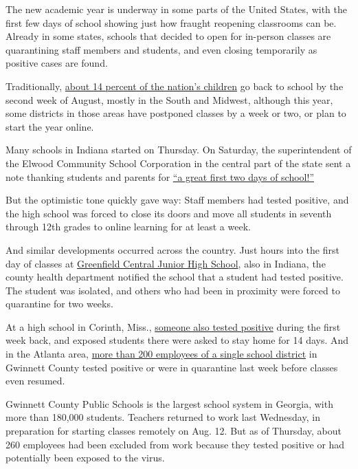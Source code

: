 The new academic year is underway in some parts of the United States,
with the first few days of school showing just how fraught reopening
classrooms can be. Already in some states, schools that decided to open
for in-person classes are quarantining staff members and students, and
even closing temporarily as positive cases are found.

Traditionally,
\href{https://www.pewresearch.org/fact-tank/2019/08/14/back-to-school-dates-u-s/}{about
14 percent of the nation's children} go back to school by the second
week of August, mostly in the South and Midwest, although this year,
some districts in those areas have postponed classes by a week or two,
or plan to start the year online.

Many schools in Indiana started on Thursday. On Saturday, the
superintendent of the Elwood Community School Corporation in the central
part of the state sent a note thanking students and parents for
\href{https://www.facebook.com/ElwoodCommunitySchools/photos/pcb.1875944365880857/1875944205880873/?type=3\&theater}{``a
great first two days of school!''}

But the optimistic tone quickly gave way: Staff members had tested
positive, and the high school was forced to close its doors and move all
students in seventh through 12th grades to online learning for at least
a week.

And similar developments occurred across the country. Just hours into
the first day of classes at
\href{https://www.nytimes.com/2020/08/01/us/schools-reopening-indiana-coronavirus.html}{Greenfield
Central Junior High School}, also in Indiana, the county health
department notified the school that a student had tested positive. The
student was isolated, and others who had been in proximity were forced
to quarantine for two weeks.

At a high school in Corinth, Miss.,
\href{https://www.facebook.com/corinthschooldistrict/?tn-str=k*F}{someone
also tested positive} during the first week back, and exposed students
there were asked to stay home for 14 days. And in the Atlanta area,
\href{https://www.ajc.com/news/atlanta-news/covid-cases-exposure-have-260-gwinnett-school-employees-not-working/RVZP4UFBPFHDNJJ73MNUFIKEPY/}{more
than 200 employees of a single school district} in Gwinnett County
tested positive or were in quarantine last week before classes even
resumed.

Gwinnett County Public Schools is the largest school system in Georgia,
with more than 180,000 students. Teachers returned to work last
Wednesday, in preparation for starting classes remotely on Aug. 12. But
as of Thursday, about 260 employees had been excluded from work because
they tested positive or had potentially been exposed to the virus.

